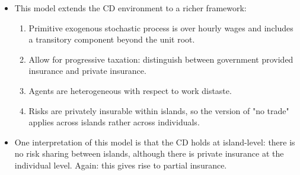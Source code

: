 \documentclass[notes=show]{beamer}
\begin{document}
\begin{frame}%



\begin{itemize}
\item This model extends the CD environment to a richer framework:

\begin{enumerate}
\item Primitive exogenous stochastic process is over hourly wages and
includes a transitory component beyond the unit root.

\item Allow for progressive taxation: distinguish between government
provided insurance and private insurance.

\item Agents are heterogeneous with respect to work distaste.

\item Risks are privately insurable within islands, so the version of "no
trade" applies across islands rather across individuals. 
\end{enumerate}

\item One interpretation of this model is that the CD holds at island-level:
there is no risk sharing between islands, although there is private
insurance at the individual level. Again: this gives rise to partial
insurance.
\end{itemize}

\transboxout%
\end{frame}%

\bigskip 
\end{document}
